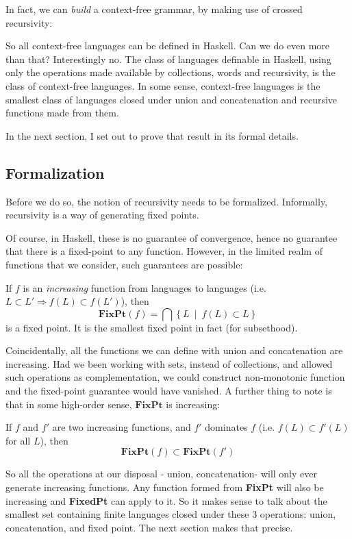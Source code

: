 In fact, we can \emph{build} a context-free grammar, by making use of crossed recursivity:



So all context-free languages can be defined in Haskell. Can we do even more than that? Interestingly no. The class of languages definable in Haskell, using only the operations made available by collections, words and recursivity, is the class of context-free languages. In some sense, context-free languages is the smallest class of languages closed under union and concatenation and recursive functions made from them.

In the next section, I set out to prove that result in its formal details.

\subsection{Formalization}

Before we do so, the notion of recursivity needs to be formalized. Informally, recursivity is a way of generating fixed points.



Of course, in Haskell, these is no guarantee of convergence, hence no guarantee that there is a fixed-point to any function. However, in the limited realm of functions that we consider, such guarantees are possible:

\begin{prop}
If $f$ is an \emph{increasing} function from languages to languages (i.e. $L\subset L' \Rightarrow f(L)\subset f(L')$), then 
$$\mathbf{FixPt}(f) = \bigcap \left\lbrace L\ \middle|\ f(L)\subset L\right\rbrace$$
is a fixed point. It is the smallest fixed point in fact (for subsethood).
\end{prop}
%
Coincidentally, all the functions we can define with union and concatenation are increasing. Had we been working with sets, instead of collections, and allowed such operations as complementation, we could construct non-monotonic function and the fixed-point guarantee would have vanished. A further thing to note is that in some high-order sense, $\mathbf{FixPt}$ is increasing:

\begin{prop}
If $f$ and $f'$ are two increasing functions, and $f'$ dominates $f$ (i.e. $f(L)\subset f'(L)$ for all $L$), then 
$$\mathbf{FixPt}(f) \subset \mathbf{FixPt}(f')$$
\end{prop}
%
So all the operations at our disposal - union, concatenation- will only ever generate increasing functions. Any function formed from \textbf{FixPt} will also be increasing and \textbf{FixedPt} can apply to it. So it makes sense to talk about the smallest set containing finite languages closed under these 3 operations: union, concatenation, and fixed point. The next section makes that precise.

